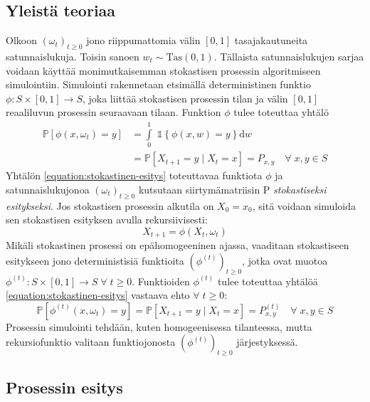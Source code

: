 \documentclass[finnish, 12pt, a4paper, sci, utf8, pdfa]{aaltothesis}
\newcommand{\indicator}{\mathopen{\mathds{1}}}
\newcommand*{\prob}{\mathbb{P}}
\begin{document}
\subsection{Yleistä teoriaa}

Olkoon \( (\omega_{t})_{t \geq 0} \) jono riippumattomia välin \( [0, 1] \) tasajakautuneita satunnaislukuja. Toisin sanoen \( w_{t} \sim \text{Tas}(0, 1) \). Tällaista satunnaislukujen sarjaa voidaan käyttää monimutkaisemman stokastisen prosessin algoritmiseen simulointiin. Simulointi rakennetaan etsimällä deterministinen funktio \( \phi : S \times [0, 1] \to S \), joka liittää stokastisen prosessin tilan ja välin \( [0, 1] \) reaaliluvun prosessin seuraavaan tilaan. Funktion \( \phi \) tulee toteuttaa yhtälö
\begin{align}
   \prob \left[ \phi(x, \omega_{t}) = y \right] &= \int\limits_0^1 \; \indicator \left\{ \phi(x, w) = y \right\} \mathrm{d}w \\
                                                &= \prob \left[ X_{t+1} = y \mid X_{t} = x \right] = P_{x,y} \quad \forall \; x, y \in S
   \label{equation:stokastinen-esitys}
\end{align}
Yhtälön \ref{equation:stokastinen-esitys} toteuttavaa funktiota \( \phi \) ja satunnaislukujonoa \( (\omega_{t})_{t \geq 0} \) kutsutaan siirtymämatriisin P \textit{stokastiseksi esitykseksi}. Jos stokastisen prosessin alkutila on \( X_{0} = x_{0} \), sitä voidaan simuloida sen stokastisen esityksen avulla rekursiivisesti:
\[
   X_{t+1} = \phi(X_{t}, \omega_{t})
\]
Mikäli stokastinen prosessi on epähomogeeninen ajassa, vaaditaan stokastiseen esitykseen jono deterministisiä funktioita \( (\phi^{(t)})_{t \geq 0} \), jotka ovat muotoa \( \phi^{(t)} : S \times [0, 1] \to S \; \forall \; t \geq 0 \). Funktioiden \( \phi^{(t)} \) tulee toteuttaa yhtälöä \ref{equation:stokastinen-esitys} vastaava ehto \( \forall \; t \geq 0 \):
\begin{equation}
   \prob \left[ \phi^{(t)}(x, \omega_{t}) = y \right] = \prob \left[ X_{t+1} = y \mid X_{t} = x \right] = P^{(t)}_{x,y} \quad \forall \; x, y \in S
   \label{equation:epahom-stokastinen-esitys}
\end{equation}
Prosessin simulointi tehdään, kuten homogeenisessa tilanteessa, mutta rekursiofunktio valitaan funktiojonosta \( (\phi^{(t)})_{t \geq 0} \) järjestyksessä. \cite{Haggstrom}

\subsection{Prosessin esitys}
\end{document}
